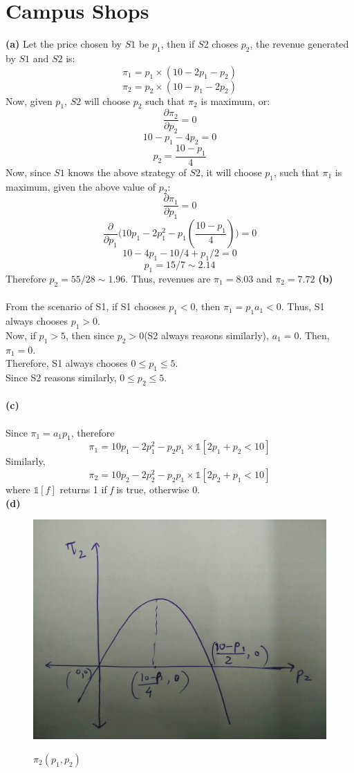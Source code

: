 \documentclass{article}
\begin{document}
\section{Campus Shops}
\textbf{(a)} Let the price chosen by $S1$ be $p_1$, then if $S2$ choses $p_2$, the revenue generated by $S1$ and $S2$ is: 
$$\pi_{1} = p_1 \times (10-2p_1-p_2)$$
$$\pi_{2} = p_2 \times (10-p_1-2p_2)$$
Now, given $p_1$, $S2$ will choose $p_2$ such that $\pi_2$ is maximum, or:
$$\frac{\partial \pi_2}{\partial p_2}= 0$$
$$ 10 - p_1 -4p_2  = 0$$
$$p_2 = \frac{10-p_1}{4}$$
Now, since $S1$ knows the above strategy of $S2$, it will choose $p_1$, such that $\pi_1$ is maximum, given the above value of $p_2$:
$$\frac{\partial \pi_1}{\partial p_1}= 0$$
$$\frac{\partial}{\partial p_1}\Big(10p_1 - 2p_1^2 -p_1(\frac{10-p_1}{4})\Big)= 0$$
$$10 - 4p_1 - 10/4 + p_1/2 = 0$$
$$p_1 = 15/7 \sim 2.14$$
Therefore $p_2 = 55/28 \sim 1.96$. Thus, revenues are $\pi_1 = 8.03$ and $\pi_2 = 7.72$ 
\newpage
\textbf{(b)} \\ \\
From the scenario of S1, if S1 chooses $p_1 < 0$, then $\pi_1= p_1a_1 < 0$. Thus, S1 always chooses $p_1 > 0 $. \\
Now, if $p_1>5$, then since $p_2 > 0$(S2 always reasons similarly), $a_1 = 0$. Then, $\pi_1=0$. \\
Therefore, S1 always chooses $0 \leq p_1 \leq 5$. \\
Since S2 reasons similarly, $0 \leq p_2 \leq 5$. \\ \\
\textbf{(c)} \\ \\
Since $\pi_1 = a_1p_1$, therefore \\
$$\pi_1 = 10p_1 - 2p_1^2 - p_2p_1 \times \mathds{1}[2p_1+p_2<10]$$
Similarly,
$$\pi_2 = 10p_2 - 2p_2^2 - p_2p_1 \times \mathds{1}[2p_2+p_1<10]$$
where $\mathds{1}[f]$ returns 1 if \emph{f} is true, otherwise 0. \\
\textbf{(d)} \\ 
\begin{figure}[h!]
\begin{center}
\includegraphics[scale=0.1]{quad1.png}
\label{qu}
\caption{$\pi_2(p_1,p_2)$}
\end{center}
\end{figure}
\end{document}
